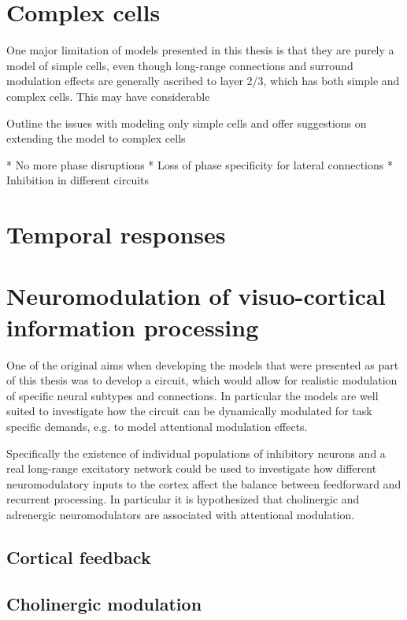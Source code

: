 \section{Complex cells}

One major limitation of models presented in this thesis is that they
are purely a model of simple cells, even though long-range connections
and surround modulation effects are generally ascribed to layer 2/3,
which has both simple and complex cells. This may have considerable

Outline the issues with modeling only simple cells and offer
suggestions on extending the model to complex cells

* No more phase disruptions
* Loss of phase specificity for lateral connections
* Inhibition in different circuits

\section{Temporal responses}


\section{Neuromodulation of visuo-cortical information processing}

One of the original aims when developing the models that were
presented as part of this thesis was to develop a circuit, which would
allow for realistic modulation of specific neural subtypes and
connections. In particular the models are well suited to investigate
how the circuit can be dynamically modulated for task specific
demands, e.g. to model attentional modulation effects.

Specifically the existence of individual populations of inhibitory
neurons and a real long-range excitatory network could be used to
investigate how different neuromodulatory inputs to the cortex affect
the balance between feedforward and recurrent processing. In
particular it is hypothesized that cholinergic and adrenergic
neuromodulators are associated with attentional modulation.

\subsection{Cortical feedback}


\subsection{Cholinergic modulation}

